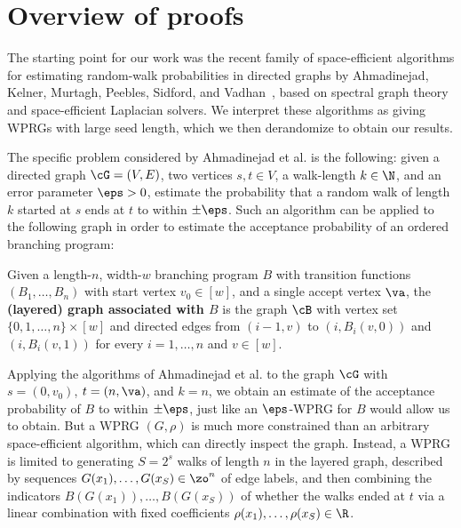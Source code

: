 \section{Overview of proofs}
The starting point for our %
%
work was %
the recent
family of %
%
%
space-efficient algorithms for estimating
random-walk probabilities in directed graphs by
%
Ahmadinejad, %
Kelner, Murtagh,
Peebles, Sidford, and Vadhan~\cite{AhmadinejadKeMuPeSiVa19}, %
%
based on spectral graph
theory and space-efficient Laplacian solvers. 
    We interpret these algorithms as giving WPRGs with large seed length, which we then derandomize to obtain our results.  
    
    The specific problem considered by %
Ahmadinejad  %
et al. is the following: given a directed graph $\cG=(V,E)$, two vertices $s,t\in V$, a walk-length $k\in \N$, and an error parameter $\eps>0$, estimate the probability that a random walk of length $k$ started at $s$ ends at $t$ to within $\pm \eps$.  Such an algorithm can be applied to the following graph in order to estimate the acceptance probability of an ordered branching program:
    \begin{definition} \label{def:OBP_graph}
%
Given a length-$n$, width-$w$    %
branching program $B$ with transition functions $(B_1,\ldots,B_n)$ with start vertex $v_0\in [w]$, and a single accept vertex $\va$, the \textbf{(layered) graph associated with $B$} is the graph $\cB$ with vertex set $\{0,1,\ldots,n\}\times[w]$ and directed edges from $(i-1,v)$ to
        $(i,B_i(v,0))$ and $(i,B_i(v,1))$ for every $i=1,\ldots,n$ and $v\in [w]$.
    \end{definition} 
    Applying the algorithms of %
Ahmadinejad  %
et al. to the graph $\cG$ with $s=(0,v_0)$, $t=(n,\va)$, and $k=n$, we obtain an estimate of the acceptance probability of $B$ to within $\pm \eps$, just like an $\eps$-WPRG for $B$ would allow us to obtain. But a WPRG $(G,\rho)$ is much more constrained than an arbitrary space-efficient algorithm, which can directly inspect the graph. Instead, a WPRG is limited to generating $S=2^s$ walks of length $n$ in the layered graph, described by sequences $G(x_1),\ldots, G(x_S)\in \zo^n$ of edge labels, and then combining the indicators $B(G(x_1)),\ldots,B(G(x_S))$ of whether the walks ended at $t$ via a linear combination with fixed coefficients $\rho(x_1),\ldots,\rho(x_S)\in \R$.
    
